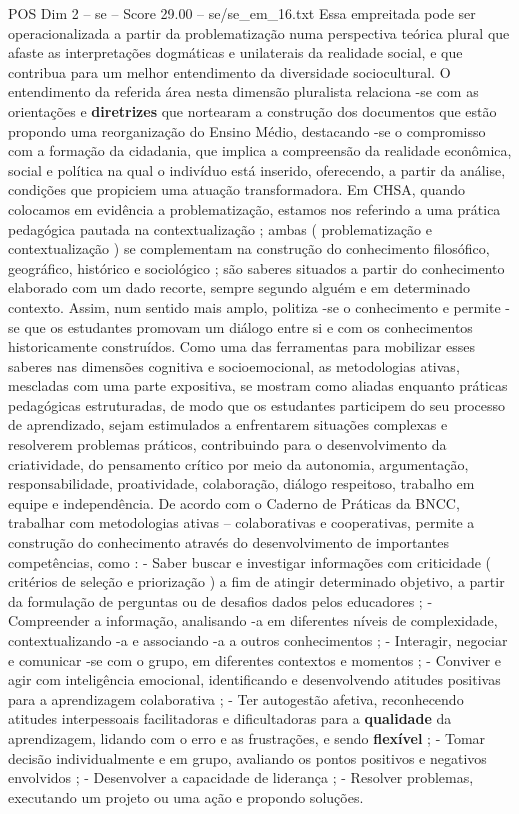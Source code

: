 \begin{textsample}{POS Dim 2 – se – Score 29.00 – se/se\_em\_16.txt}
Essa empreitada pode ser operacionalizada a partir da problematização numa perspectiva teórica plural que afaste as interpretações dogmáticas e unilaterais da realidade social, e que contribua para um melhor entendimento da diversidade sociocultural.
O entendimento da referida área nesta dimensão pluralista relaciona -se com as orientações e \textbf{diretrizes} que nortearam a construção dos documentos que estão propondo uma reorganização do Ensino Médio, destacando -se o compromisso com a formação da cidadania, que implica a compreensão da realidade econômica, social e política na qual o indivíduo está inserido, oferecendo, a partir da análise, condições que propiciem uma atuação transformadora.
Em CHSA, quando colocamos em evidência a problematização, estamos nos referindo a uma prática pedagógica pautada na contextualização ; ambas ( problematização e contextualização ) se complementam na construção do conhecimento filosófico, geográfico, histórico e sociológico ; são saberes situados a partir do conhecimento elaborado com um dado recorte, sempre segundo alguém e em determinado contexto.
Assim, num sentido mais amplo, politiza -se o conhecimento e permite -se que os estudantes promovam um diálogo entre si e com os conhecimentos historicamente construídos.
Como uma das ferramentas para mobilizar esses saberes nas dimensões cognitiva e socioemocional, as metodologias ativas, mescladas com uma parte expositiva, se mostram como aliadas enquanto práticas pedagógicas estruturadas, de modo que os estudantes participem do seu processo de aprendizado, sejam estimulados a enfrentarem situações complexas e resolverem problemas práticos, contribuindo para o desenvolvimento da criatividade, do pensamento crítico por meio da autonomia, argumentação, responsabilidade, proatividade, colaboração, diálogo respeitoso, trabalho em equipe e independência.
De acordo com o Caderno de Práticas da BNCC, trabalhar com metodologias ativas – colaborativas e cooperativas, permite a construção do conhecimento através do desenvolvimento de importantes competências, como : - Saber buscar e investigar informações com criticidade ( critérios de seleção e priorização ) a fim de atingir determinado objetivo, a partir da formulação de perguntas ou de desafios dados pelos educadores ; - Compreender a informação, analisando -a em diferentes níveis de complexidade, contextualizando -a e associando -a a outros conhecimentos ; - Interagir, negociar e comunicar -se com o grupo, em diferentes contextos e momentos ; - Conviver e agir com inteligência emocional, identificando e desenvolvendo atitudes positivas para a aprendizagem colaborativa ; - Ter autogestão afetiva, reconhecendo atitudes interpessoais facilitadoras e dificultadoras para a \textbf{qualidade} da aprendizagem, lidando com o erro e as frustrações, e sendo \textbf{flexível} ; - Tomar decisão individualmente e em grupo, avaliando os pontos positivos e negativos envolvidos ; - Desenvolver a capacidade de liderança ; - Resolver problemas, executando um projeto ou uma ação e propondo soluções.

\end{textsample}
